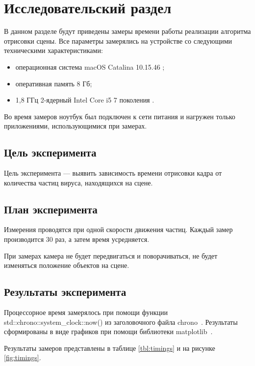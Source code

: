 \chapter{Исследовательский раздел}
\label{cha:research}

В данном разделе будут приведены замеры времени работы реализации алгоритма отрисовки сцены.
Все параметры замерялись на устройстве со следующими техническими характеристиками:
\begin{itemize}
	\item операционная система macOS Catalina 10.15.46 \cite{monterey};
	\item оперативная память 8 Гб;
	\item 1,8 ГГц 2-ядерный Intel Core i5 7 поколения \cite{intel}.
\end{itemize}

Во время замеров ноутбук был подключен к сети питания и нагружен только приложениями, использующимися при замерах.

\section{Цель эксперимента}

Цель эксперимента --- выявить зависимость времени отрисовки кадра от количества частиц вируса, находящихся на сцене. 

\section{План эксперимента}

Измерения проводятся при одной скорости движения частиц. Каждый замер производится 30 раз, а затем время усредняется.

При замерах камера не будет передвигаться и поворачиваться, не будет изменяться положение объектов на сцене.

\section{Результаты эксперимента}

Процессорное время замерялось при помощи функции std::chrono::system\_clock::now() из заголовочного файла chrono~\cite{cplusplus}. Результаты сформированы в виде графиков при помощи библиотеки matplotlib~\cite{matplotlib}. 

Результаты замеров представлены в таблице \ref{tbl:timings} и на рисунке \ref{fig:timings}.

